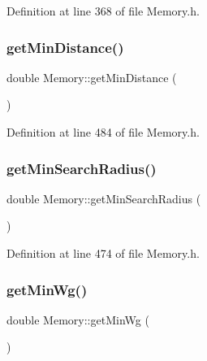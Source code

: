 Definition at line 368 of file Memory.\+h.

\mbox{\label{class_memory_af8bb8336585ad267f1ea7ca8c35b7421}} 
\subsubsection{\texorpdfstring{get\+Min\+Distance()}{getMinDistance()}}
{\footnotesize\ttfamily double Memory\+::get\+Min\+Distance (\begin{DoxyParamCaption}{ }\end{DoxyParamCaption})\hspace{0.3cm}{\ttfamily [inline]}}



Definition at line 484 of file Memory.\+h.

\mbox{\label{class_memory_a22d038e7c6a1a9c273af2f14764cdca5}} 
\subsubsection{\texorpdfstring{get\+Min\+Search\+Radius()}{getMinSearchRadius()}}
{\footnotesize\ttfamily double Memory\+::get\+Min\+Search\+Radius (\begin{DoxyParamCaption}{ }\end{DoxyParamCaption})\hspace{0.3cm}{\ttfamily [inline]}}



Definition at line 474 of file Memory.\+h.

\mbox{\label{class_memory_aba901fec044454033b0534d2a602eeb4}} 
\subsubsection{\texorpdfstring{get\+Min\+Wg()}{getMinWg()}}
{\footnotesize\ttfamily double Memory\+::get\+Min\+Wg (\begin{DoxyParamCaption}{ }\end{DoxyParamCaption})\hspace{0.3cm}{\ttfamily [inline]}}



